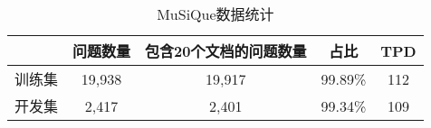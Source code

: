 \begin{table}[htbp]
    \centering
    \caption{MuSiQue数据统计}
    \label{tab:2-3}
    \begin{tabular}{ccccc}
        \hline
        & 问题数量 & 包含20个文档的问题数量 & 占比 & TPD \\
        \hline
        训练集 & 19,938 & 19,917 & 99.89\% & 112 \\
        开发集 & 2,417 & 2,401 & 99.34\% & 109 \\
        \hline
    \end{tabular}
\end{table}


